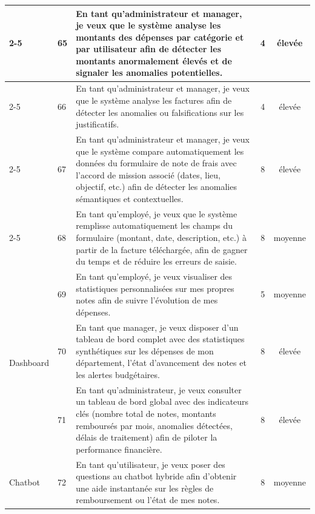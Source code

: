\documentclass[12pt,a4paper]{report}
\begin{document}
\begin{longtable}{|p{2cm}|p{1cm}|p{8.3cm}|c|c|}
\cline{2-5}

& 65 & En tant qu'administrateur et manager, je veux que le système analyse les montants des dépenses par catégorie et par utilisateur afin de détecter les montants anormalement élevés et de signaler les anomalies potentielles. & 4 & élevée \\

\cline{2-5}

& 66 & En tant qu'administrateur et manager, je veux que le système analyse les factures afin de détecter les anomalies ou falsifications sur les justificatifs. & 4 & élevée \\

\cline{2-5}

& 67 & En tant qu'administrateur et manager, je veux que le système compare automatiquement les données du formulaire de note de frais avec l'accord de mission associé (dates, lieu, objectif, etc.) afin de détecter les anomalies sémantiques et contextuelles. & 8 & élevée \\

\cline{2-5}

& 68 & En tant qu'employé, je veux que le système remplisse automatiquement les champs du formulaire (montant, date, description, etc.) à partir de la facture téléchargée, afin de gagner du temps et de réduire les erreurs de saisie. & 8 & moyenne \\

\hline



\multirow{3}{*}{Dashboard} & 69 & En tant qu'employé, je veux visualiser des statistiques personnalisées sur mes propres notes afin de suivre l'évolution de mes dépenses. & 5 & moyenne \\

\cline{2-5}

& 70 & En tant que manager, je veux disposer d'un tableau de bord complet avec des statistiques synthétiques sur les dépenses de mon département, l'état d'avancement des notes et les alertes budgétaires. & 8 & élevée \\

\cline{2-5}

& 71 & En tant qu'administrateur, je veux consulter un tableau de bord global avec des indicateurs clés (nombre total de notes, montants remboursés par mois, anomalies détectées, délais de traitement) afin de piloter la performance financière. & 8 & élevée \\

\hline



Chatbot & 72 & En tant qu'utilisateur, je veux poser des questions au chatbot hybride afin d'obtenir une aide instantanée sur les règles de remboursement ou l'état de mes notes. & 8 & moyenne \\

\hline



\end{longtable}
\end{document}
